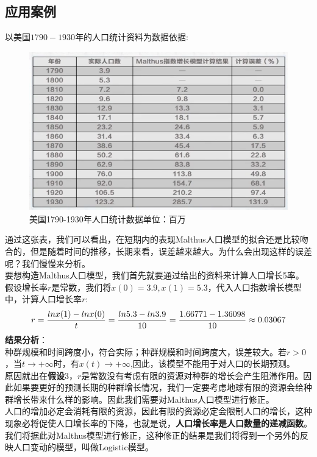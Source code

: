 \documentclass[openany]{progbookcn}
\begin{document}
\subsection{应用案例}
\indent 以美国$1790-1930$年的人口统计资料为数据依据:
\begin{figure}[H]
\centering
\includegraphics[width=0.6 \textwidth]{figs/chapter4/美国人口统计数据}
\caption{美国1790-1930年人口统计数据\quad 单位：百万}
\end{figure}
\indent 通过这张表，我们可以看出，在短期内的表现Malthus人口模型的拟合还是比较吻合的，但是随着时间的推移，长期来看，误差越来越大。为什么会出现这样的误差呢？我们慢慢来分析。\\
\indent 要想构造Malthus人口模型，我们首先就要通过给出的资料来计算人口增长5率。假设增长率$r$是常数，我们将$x(0)=3.9,x(1)=5.3$，代入人口指数增长模型中，计算人口增长率$r$:
\begin{equation}
r={{lnx(1)-lnx(0)}\over{t}}={{ln5.3-ln3.9}\over{10}}={{1.66771-1.36098}\over{10}}\approx 0.03067
\end{equation}
\noindent \textbf{结果分析}：\\
\indent 种群规模和时间跨度小，符合实际；种群规模和时间跨度大，误差较大。若$r>0$，当$t\to +\infty$时，有$x(t)\to +\infty$,因此，该模型不能用于对人口的长期预测。\\
\indent 原因就出在{\bf 假设$3$}，$r$是常数没有考虑有限的资源对种群的增长会产生阻滞作用。因此如果要更好的预测长期的种群增长情况，我们一定要考虑地球有限的资源会给种群增长带来什么样的影响。因此我们需要对Malthus人口模型进行修正。\\
\indent 人口的增加必定会消耗有限的资源，因此有限的资源必定会限制人口的增长，这种现象必将促使人口增长率的下降，也就是说，{\bf 人口增长率是人口数量的递减函数}。我们将据此对Malthus模型进行修正，这种修正的结果是我们将得到一个另外的反映人口变动的模型，叫做Logistic模型。
\end{document}
